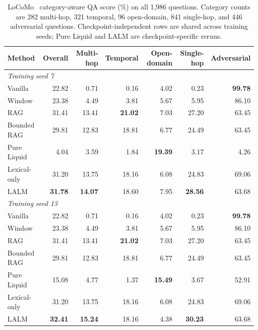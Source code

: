 \documentclass[conference]{IEEEtran}
\begin{document}
\begin{table}[t]
\centering
\small
\caption{LoCoMo~\cite{maharana2024locomo} category-aware QA score (\%) on all 1,986 questions. Category
counts are 282 multi-hop, 321 temporal, 96 open-domain, 841 single-hop, and
446 adversarial questions. Checkpoint-independent rows are shared across
training seeds; Pure Liquid and LALM are checkpoint-specific reruns.}
\label{tab:locomo}
\begin{tabular}{lrrrrrr}
\toprule
Method & Overall & Multi-hop & Temporal & Open-domain & Single-hop & Adversarial\\
\midrule
\multicolumn{7}{l}{\emph{Training seed 7}}\\
Vanilla      & 22.82 & 0.71 & 0.16 & 4.02 & 0.23 & \textbf{99.78}\\
Window       & 23.38 & 4.49 & 3.81 & 5.67 & 5.95 & 86.10\\
RAG          & 31.41 & 13.41 & \textbf{21.02} & 7.03 & 27.20 & 63.45\\
Bounded RAG  & 29.81 & 12.83 & 18.81 & 6.77 & 24.49 & 63.45\\
Pure Liquid  & 4.04 & 3.59 & 1.84 & \textbf{19.39} & 3.17 & 4.26\\
Lexical-only & 31.20 & 13.75 & 18.16 & 6.08 & 24.83 & 69.06\\
LALM         & \textbf{31.78} & \textbf{14.07} & 18.60 & 7.95 &
\textbf{28.56} & 63.68\\
\midrule
\multicolumn{7}{l}{\emph{Training seed 13}}\\
Vanilla      & 22.82 & 0.71 & 0.16 & 4.02 & 0.23 & \textbf{99.78}\\
Window       & 23.38 & 4.49 & 3.81 & 5.67 & 5.95 & 86.10\\
RAG          & 31.41 & 13.41 & \textbf{21.02} & 7.03 & 27.20 & 63.45\\
Bounded RAG  & 29.81 & 12.83 & 18.81 & 6.77 & 24.49 & 63.45\\
Pure Liquid  & 15.08 & 4.77 & 1.37 & \textbf{15.49} & 3.67 & 52.91\\
Lexical-only & 31.20 & 13.75 & 18.16 & 6.08 & 24.83 & 69.06\\
LALM         & \textbf{32.41} & \textbf{15.24} & 18.16 & 4.38 &
\textbf{30.23} & 63.68\\
\bottomrule
\end{tabular}
\end{table}
\end{document}
